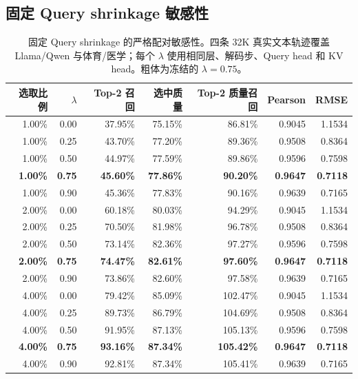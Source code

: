 \subsection{固定 Query shrinkage 敏感性}
\label{app:shrinkage-sensitivity}
\begin{table}[t]
\caption{固定 Query shrinkage 的严格配对敏感性。四条 32K 真实文本轨迹覆盖 Llama/Qwen 与体育/医学；每个 $\lambda$ 使用相同层、解码步、Query head 和 KV head。粗体为冻结的 $\lambda=0.75$。}
\label{tab:shrinkage-grid}
\centering\small
\begin{tabular}{rrrrrrr}
\toprule
选取比例 & $\lambda$ & Top-2 召回 & 选中质量 & Top-2 质量召回 & Pearson & RMSE \\
\midrule
1.00\% & 0.00 & 37.95\% & 75.15\% & 86.81\% & 0.9045 & 1.1534 \\
1.00\% & 0.25 & 43.70\% & 77.20\% & 89.36\% & 0.9508 & 0.8364 \\
1.00\% & 0.50 & 44.97\% & 77.59\% & 89.86\% & 0.9596 & 0.7598 \\
\textbf{1.00\%} & \textbf{0.75} & \textbf{45.60\%} & \textbf{77.86\%} & \textbf{90.20\%} & \textbf{0.9647} & \textbf{0.7118} \\
1.00\% & 0.90 & 45.36\% & 77.83\% & 90.16\% & 0.9639 & 0.7165 \\
2.00\% & 0.00 & 60.18\% & 80.03\% & 94.29\% & 0.9045 & 1.1534 \\
2.00\% & 0.25 & 70.50\% & 81.98\% & 96.78\% & 0.9508 & 0.8364 \\
2.00\% & 0.50 & 73.14\% & 82.36\% & 97.27\% & 0.9596 & 0.7598 \\
\textbf{2.00\%} & \textbf{0.75} & \textbf{74.47\%} & \textbf{82.61\%} & \textbf{97.60\%} & \textbf{0.9647} & \textbf{0.7118} \\
2.00\% & 0.90 & 73.86\% & 82.60\% & 97.58\% & 0.9639 & 0.7165 \\
4.00\% & 0.00 & 79.42\% & 85.09\% & 102.47\% & 0.9045 & 1.1534 \\
4.00\% & 0.25 & 89.73\% & 86.79\% & 104.69\% & 0.9508 & 0.8364 \\
4.00\% & 0.50 & 91.95\% & 87.13\% & 105.13\% & 0.9596 & 0.7598 \\
\textbf{4.00\%} & \textbf{0.75} & \textbf{93.16\%} & \textbf{87.34\%} & \textbf{105.42\%} & \textbf{0.9647} & \textbf{0.7118} \\
4.00\% & 0.90 & 92.81\% & 87.34\% & 105.41\% & 0.9639 & 0.7165 \\
\bottomrule
\end{tabular}
\end{table}

